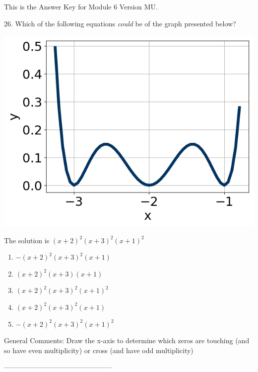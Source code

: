 \documentclass{article}[10pt]
\begin{document}
This is the Answer Key for Module 6 Version MU.

26. Which of the following equations \textit{could} be of the graph presented below?
$$  $$ 
\begin{center}\includegraphics[scale=0.5]{../Figures/question26MU.png}\end{center}The solution is $ (x + 2)^2(x + 3)^2(x + 1)^2 $ 

\begin{enumerate}[label=\Alph*.] 
\item $ -(x + 2)^2(x + 3)^2(x + 1) $ 

  
\item $ (x + 2)^2(x + 3)(x + 1) $ 

  
\item $ (x + 2)^2(x + 3)^2(x + 1)^2 $ 

  
\item $ (x + 2)^2(x + 3)^2(x + 1) $ 

  
\item $ -(x + 2)^2(x + 3)^2(x + 1)^2 $ 

  
\end{enumerate} 
 
General Comments: Draw the x-axis to determine which zeros are touching (and so have even multiplicity) or cross (and have odd multiplicity)

-----------------------------------------------
\end{document}
